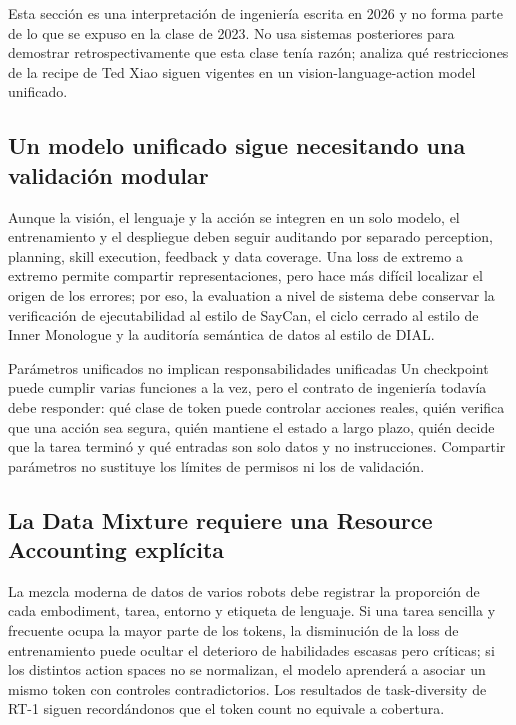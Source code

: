 \documentclass[a4paper]{article}
\begin{document}
Esta sección es una interpretación de ingeniería escrita en 2026 y no forma parte de lo que se expuso en la clase de 2023. No usa sistemas posteriores para demostrar retrospectivamente que esta clase tenía razón; analiza qué restricciones de la recipe de Ted Xiao siguen vigentes en un vision-language-action model unificado.

\subsection{Un modelo unificado sigue necesitando una validación modular}

Aunque la visión, el lenguaje y la acción se integren en un solo modelo, el entrenamiento y el despliegue deben seguir auditando por separado perception, planning, skill execution, feedback y data coverage. Una loss de extremo a extremo permite compartir representaciones, pero hace más difícil localizar el origen de los errores; por eso, la evaluation a nivel de sistema debe conservar la verificación de ejecutabilidad al estilo de SayCan, el ciclo cerrado al estilo de Inner Monologue y la auditoría semántica de datos al estilo de DIAL.

\begin{importantbox}{Parámetros unificados no implican responsabilidades unificadas}
Un checkpoint puede cumplir varias funciones a la vez, pero el contrato de ingeniería todavía debe responder: qué clase de token puede controlar acciones reales, quién verifica que una acción sea segura, quién mantiene el estado a largo plazo, quién decide que la tarea terminó y qué entradas son solo datos y no instrucciones. Compartir parámetros no sustituye los límites de permisos ni los de validación.
\end{importantbox}

\subsection{La Data Mixture requiere una Resource Accounting explícita}

La mezcla moderna de datos de varios robots debe registrar la proporción de cada embodiment, tarea, entorno y etiqueta de lenguaje. Si una tarea sencilla y frecuente ocupa la mayor parte de los tokens, la disminución de la loss de entrenamiento puede ocultar el deterioro de habilidades escasas pero críticas; si los distintos action spaces no se normalizan, el modelo aprenderá a asociar un mismo token con controles contradictorios. Los resultados de task-diversity de RT-1 siguen recordándonos que el token count no equivale a cobertura.
\end{document}
